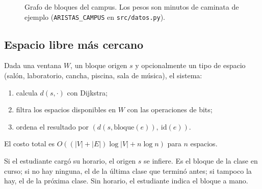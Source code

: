 \documentclass[conference,a4paper]{IEEEtran}
\begin{document}
\begin{figure}[t]
\centering
{}
\caption{Grafo de bloques del campus. Los pesos son minutos de caminata de ejemplo
(\texttt{ARISTAS\_CAMPUS} en \texttt{src/datos.py}).}
\label{fig:grafo}
\end{figure}

\subsection{Espacio libre más cercano}
Dada una ventana $W$, un bloque origen $s$ y opcionalmente un tipo de espacio (salón,
laboratorio, cancha, piscina, sala de música), el sistema:
\begin{enumerate}
  \item calcula $d(s,\cdot)$ con Dijkstra;
  \item filtra los espacios disponibles en $W$ con las operaciones de bits;
  \item ordena el resultado por $(d(s,\text{bloque}(e)),\ \text{id}(e))$.
\end{enumerate}
El costo total es $O((|V|+|E|)\log|V| + n\log n)$ para $n$ espacios.

Si el estudiante cargó su horario, el origen $s$ se infiere. Es el bloque de la clase
en curso; si no hay ninguna, el de la última clase que terminó antes; si tampoco la
hay, el de la próxima clase. Sin horario, el estudiante indica el bloque a mano.
\end{document}
